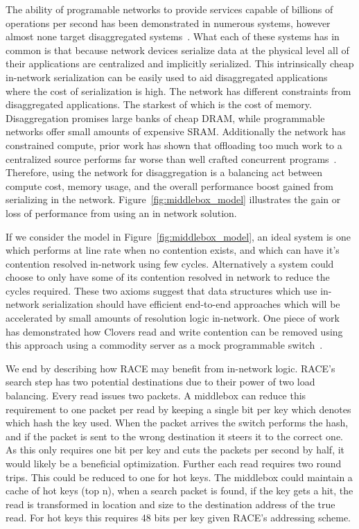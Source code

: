 The ability of programable networks to provide services capable of billions of
operations per second has been demonstrated in numerous systems, however almost
none target disaggregated
systems~\cite{netlock,netchain,netcache,netkv,kv-direct,mind}. What each of
these systems has in common is that because network devices serialize data at
the physical level all of their applications are centralized and implicitly
serialized. This intrinsically cheap in-network serialization can be easily used
to aid disaggregated applications where the cost of serialization is high.  The
network has different constraints from disaggregated applications. The starkest
of which is the cost of memory. Disaggregation promises large banks of cheap
DRAM, while programmable networks offer small amounts of expensive SRAM.
Additionally the network has constrained compute, prior work has shown that
offloading too much work to a centralized source performs far worse than well
crafted concurrent programs~\cite{near-memory-structs}. Therefore, using the
network for disaggregation is a balancing act between compute cost, memory
usage, and the overall performance boost gained from serializing in the network.
Figure~\ref{fig:middlebox_model} illustrates the gain or loss of performance
from using an in network solution.

If we consider the model in Figure~\ref{fig:middlebox_model}, an ideal system is
one which performs at line rate when no contention exists, and which can have
it's contention resolved in-network using few cycles. Alternatively a system
could choose to only have some of its contention resolved in network to reduce
the cycles required. These two axioms suggest that data structures which use
in-network serialization should have efficient end-to-end approaches which will
be accelerated by small amounts of resolution logic in-network. One piece of
work has demonstrated how Clovers read and write contention can be removed using
this approach using a commodity server as a mock programmable
switch~\cite{Grant2021InContRes}.

We end by describing how RACE may benefit from in-network logic. RACE's
search step has two potential destinations due to their power of two load
balancing. Every read issues two packets. A middlebox can reduce this
requirement to one packet per read by keeping a single bit per key which denotes
which hash the key used. When the packet arrives the switch performs the hash,
and if the packet is sent to the wrong destination it steers it to the correct
one. As this only requires one bit per key and cuts the packets per second by
half, it would likely be a beneficial optimization. Further each read requires
two round trips. This could be reduced to one for hot keys. The middlebox could
maintain a cache of hot keys (top n), when a search packet is found, if the key
gets a hit, the read is transformed in location and size to the destination
address of the true read. For hot keys this requires 48 bits per key given
RACE's addressing scheme.

